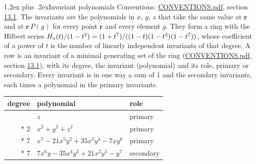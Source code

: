 \documentclass[10pt,a4paper]{article}
\makeatletter
\renewcommand\section{\@startsection{section}{1}{\z@}{-3ex plus -1ex minus -.2ex}%
  {1.2ex plus .2ex}{\normalfont\large\sffamily\bfseries\color{parttitle}}}
\numberwithin{equation}{section}
\newcommand{\irr}[1]{\text{\normalfont\scshape #1}}
\newcommand{\pointr}{\mathbf{r}}
\makeatother
\begin{document}
\section{Invariant polynomials}\label{s:invariant_polynomials}
Conventions: \href{../../CONVENTIONS.pdf}{CONVENTIONS.pdf}, section \href{../../CONVENTIONS.pdf\#conv.13.1}{13.1}.
The invariants are the polynomials in $x$, $y$, $z$ that take the same value at $\pointr$ and at $\pointr\,P(g)$ for every point $\pointr$ and every element $g$. They form a ring with the Hilbert series $H_{\irr{a}}(t)/(1-t^{2}) = (1 + t^{7})/((1-t)(1-t^{2})(1-t^{7}))$, whose coefficient of a power of $t$ is the number of linearly independent invariants of that degree. \label{n:head.degree}\label{n:head.role}A row is an invariant of a minimal generating set of the ring (\href{../../CONVENTIONS.pdf}{CONVENTIONS.pdf}, section \href{../../CONVENTIONS.pdf\#conv.13.1}{13.1}), with its degree, the invariant (polynomial) and its role, primary or secondary. Every invariant is in one way a sum of 1 and the secondary invariants, each times a polynomial in the primary invariants.
{\small\begin{longtable}{@{}rll@{}}\toprule
degree & polynomial & role\\\midrule\endhead
\bottomrule\endfoot\endlastfoot
1 & $z$ & primary\\*
2 & $x^{2} + y^{2} + z^{2}$ & primary\\*
7 & $x^{7} - 21x^{5}y^{2} + 35x^{3}y^{4} - 7xy^{6}$ & primary\\*
7 & $7x^{6}y - 35x^{4}y^{3} + 21x^{2}y^{5} - y^{7}$ & secondary\\
\bottomrule\end{longtable}}
\end{document}
